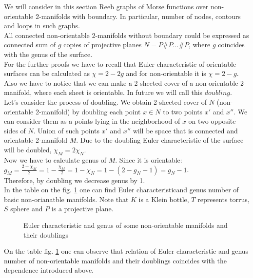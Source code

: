 \documentclass[]{article}
\begin{document}
We will consider in this section Reeb graphs of Morse functions over non-orientable 2-manifolds with boundary. In particular, number of nodes, contours and loops in such graphs. \\
All connected non-orientable 2-manifolds without boundary could be expressed as connected sum of  $g$ copies of projective planes $N=P\# P...\# P$, where $g$ coincides with the genus of the surface.\\
For the further proofs we have to recall that Euler characteristic of orientable surfaces can be calculated as $\chi=2-2g$ and for non-orientable it is $\chi=2-g$. Also we have to notice that we can make a 2-sheeted cover of a non-orientable 2-manifold, where each sheet is orientable. In future we will call this $doubling$. \\
Let's consider the process of doubling. We obtain 2-sheeted cover of $N$ (non-orientable 2-manifold) by doubling each point $x\in N$ to two points $x'$ and $x''$. We can consider them as a points lying in the neighborhood of $x$ on two opposite sides of $N$. Union of such points $x'$ and $x''$ will be space that is connected and orientable 2-manifold $M$. Due to the doubling Euler characteristic of the surface will be doubled, $\chi_M=2\chi_N$. \\
Now we have to calculate genus of $M$. Since it is orientable:\\ $g_M=\frac{2-\chi_M}{2}=1-\frac{\chi_M}{2}=1-\chi_N=1-(2-g_N-1)=g_N-1$. \\
Therefore, by doubling we decrease genus by 1. \\
In the table on the fig. \ref{fig:Table} one can find Euler characteristicand genus number of basic non-orianatble manifolds. Note that $K$ is a Klein bottle, $T$ represents torrus,$S$ sphere and $P$ is a projective plane. 
\begin{figure}[h!]
\caption{Euler characteristic and genus of some non-orientable manifolds and their doublings}
\label{fig:Table}
\end{figure}
On the table fig. \ref{fig:Table} one can observe that relation of Euler characteristic and genus number of non-orientable manifolds and their doublings coincides with the dependence introduced above. \\
\end{document}
